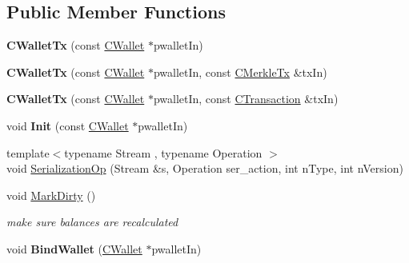 \subsection*{Public Member Functions}
\begin{DoxyCompactItemize}
\item 
\mbox{\label{class_c_wallet_tx_a0b1a0f58fbe4c65d47136e1a650cee84}} 
{\bfseries C\+Wallet\+Tx} (const \mbox{\hyperlink{class_c_wallet}{C\+Wallet}} $\ast$pwallet\+In)
\item 
\mbox{\label{class_c_wallet_tx_a8e58ffb8a69ea68fc366b8a53ef345ef}} 
{\bfseries C\+Wallet\+Tx} (const \mbox{\hyperlink{class_c_wallet}{C\+Wallet}} $\ast$pwallet\+In, const \mbox{\hyperlink{class_c_merkle_tx}{C\+Merkle\+Tx}} \&tx\+In)
\item 
\mbox{\label{class_c_wallet_tx_a626a5d41502247ea13b0c90694455468}} 
{\bfseries C\+Wallet\+Tx} (const \mbox{\hyperlink{class_c_wallet}{C\+Wallet}} $\ast$pwallet\+In, const \mbox{\hyperlink{class_c_transaction}{C\+Transaction}} \&tx\+In)
\item 
\mbox{\label{class_c_wallet_tx_ad207b1e6b355946842a126bc14c7e793}} 
void {\bfseries Init} (const \mbox{\hyperlink{class_c_wallet}{C\+Wallet}} $\ast$pwallet\+In)
\item 
{\footnotesize template$<$typename Stream , typename Operation $>$ }\\void \mbox{\hyperlink{class_c_wallet_tx_a94e65d0105f2a75a627e374b0bbefe06}{Serialization\+Op}} (Stream \&s, Operation ser\+\_\+action, int n\+Type, int n\+Version)
\item 
\mbox{\label{class_c_wallet_tx_ac8a376bcb955e437489504dc596b43cf}} 
void \mbox{\hyperlink{class_c_wallet_tx_ac8a376bcb955e437489504dc596b43cf}{Mark\+Dirty}} ()
\begin{DoxyCompactList}\small\item\em make sure balances are recalculated \end{DoxyCompactList}\item 
\mbox{\label{class_c_wallet_tx_ab0ee7347584bff886dc24b9f63ff023c}} 
void {\bfseries Bind\+Wallet} (\mbox{\hyperlink{class_c_wallet}{C\+Wallet}} $\ast$pwallet\+In)
\item 

\end{DoxyCompactItemize}
